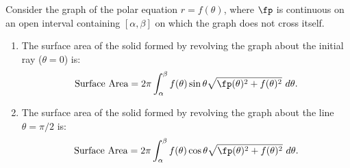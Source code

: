 {Consider the graph of the polar equation $r=f(\theta)$, where $\fp$ is continuous on an open interval containing $[\alpha,\beta]$ on which the graph does not cross itself.
	\begin{enumerate}
		\item The surface area of the solid formed by revolving the graph about the initial ray ($\theta=0$) is:
		$$\text{Surface Area} = 2\pi\int_\alpha^\beta f(\theta)\sin\theta\sqrt{\fp(\theta)^2+f(\theta)^2}\ d\theta.$$
		\item The surface area of the solid formed by revolving the graph about the line $\theta=\pi/2$ is:
		$$\text{Surface Area} = 2\pi\int_\alpha^\beta f(\theta)\cos\theta\sqrt{\fp(\theta)^2+f(\theta)^2}\ d\theta.$$
	\end{enumerate}
}
\clearpage

